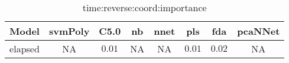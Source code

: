 \begin{table}[!ht]
	\centering
	\begin{tabular}{|c|c|c|c|c|c|c|c|}
		\hline
		Model & svmPoly & C5.0 & nb & nnet & pls & fda & pcaNNet \\ \hline
		elapsed & NA & $0.01$ & NA & NA & $0.01$ & $0.02$ & NA \\ \hline
	\end{tabular}
	\caption{time:reverse:coord:importance}
	\label{tab:time:reverse:coord:importance}
\end{table}
